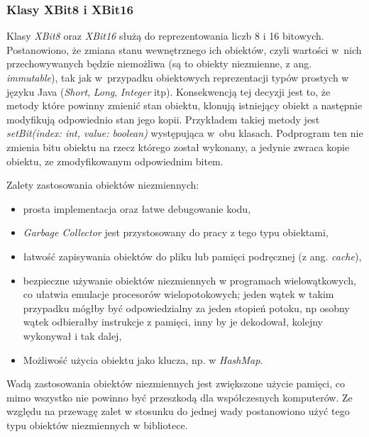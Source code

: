 	\subsubsection{Klasy XBit8 i XBit16}
	Klasy \emph{XBit8} oraz \emph{XBit16} służą do reprezentowania liczb 8 i 16 bitowych. Postanowiono, że zmiana stanu wewnętrznego ich obiektów, czyli wartości w~nich przechowywanych będzie niemożliwa (są to obiekty niezmienne, z ang. \emph{immutable}), tak jak w~przypadku obiektowych reprezentacji typów prostych w języku Java (\emph{Short}, \emph{Long}, \emph{Integer} itp).  Konsekwencją tej decyzji jest to, że metody które powinny zmienić stan obiektu, klonują istniejący obiekt a następnie modyfikują odpowiednio stan jego kopii. Przykładem takiej metody jest \emph{setBit(index: int, value: boolean)} występująca w~obu klasach. Podprogram ten nie zmienia bitu obiektu na rzecz którego został wykonany, a jedynie zwraca kopie obiektu, ze zmodyfikowanym odpowiednim bitem. 
	
	Zalety zastosowania obiektów niezmiennych:
	\begin{itemize} 
		\item prosta implementacja oraz łatwe debugowanie kodu,
		\item \emph{Garbage Collector} jest przystosowany do pracy z tego typu obiektami,
		\item łatwość zapisywania obiektów do pliku lub pamięci podręcznej (z ang. \emph{cache}),
		\item bezpieczne używanie obiektów niezmiennych w programach wielowątkowych, co ułatwia emulacje procesorów wielopotokowych; jeden wątek w takim przypadku mógłby być odpowiedzialny za jeden stopień potoku, np osobny wątek odbierałby instrukcje z pamięci, inny by je dekodował, kolejny wykonywał i tak dalej,
		\item Możliwość użycia obiektu jako klucza, np. w \emph{HashMap}. 
	\end{itemize}

	Wadą zastosowania obiektów niezmiennych jest zwiększone użycie pamięci, co mimo wszystko nie powinno być przeszkodą dla współczesnych komputerów. Ze względu na przewagę zalet w stosunku do jednej wady postanowiono użyć tego typu obiektów niezmiennych w bibliotece.
	
